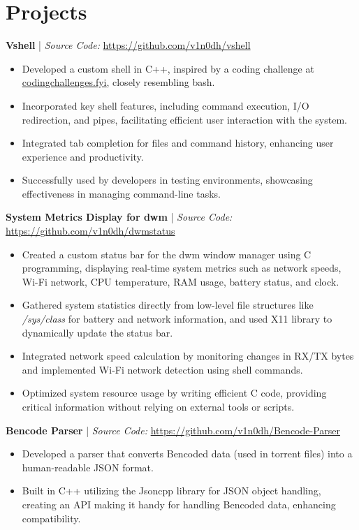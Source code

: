 \documentclass[10pt, letterpaper]{article}
\newcommand{\projsection}[2] {
	\raggedright{\normalsize\bfseries{#1}} | {\small \textit{Source Code:} \hspace{0.1em} \href{#2}{#2}}
}
\begin{document}
\section{Projects}
\projsection
{Vshell}
{https://github.com/v1n0dh/vshell}
\vspace*{-0.5em}
\begin{itemize}[leftmargin=6mm]
	\setlength\itemsep{0em}
	\item{Developed a custom shell in C++, inspired by a coding challenge at \href{https://codingchallenges.fyi/challenges/challenge-shell}{\underline {codingchallenges.fyi}}, closely resembling bash.}
	\item{Incorporated key shell features, including command execution, I/O redirection, and pipes, facilitating efficient user interaction with the system.}
	\item{Integrated tab completion for files and command history, enhancing user experience and productivity.}
	\item{Successfully used by developers in testing environments, showcasing effectiveness in managing command-line tasks.}
\end{itemize}

\projsection
{System Metrics Display for dwm}
{https://github.com/v1n0dh/dwmstatus}
\vspace*{-0.5em}
\begin{itemize}[leftmargin=6mm]
	\setlength\itemsep{0em}
	\item{Created a custom status bar for the dwm window manager using C programming, displaying real-time system metrics such as network speeds, Wi-Fi network, CPU temperature, RAM usage, battery status, and clock.}
	\item{Gathered system statistics directly from low-level file structures like \textit{/sys/class} for battery and network information, and used X11 library to dynamically update the status bar.}
	\item{Integrated network speed calculation by monitoring changes in RX/TX bytes and implemented Wi-Fi network detection using shell commands.}
	\item{Optimized system resource usage by writing efficient C code, providing critical information without relying on external tools or scripts.}
\end{itemize}

\projsection
{Bencode Parser}
{https://github.com/v1n0dh/Bencode-Parser}
\vspace*{-0.5em}
\begin{itemize}[leftmargin=6mm]
	\setlength\itemsep{0em}
	\item{Developed a parser that converts Bencoded data (used in torrent files) into a human-readable JSON format.}
	\item{Built in C++ utilizing the Jsoncpp library for JSON object handling, creating an API making it handy for handling Bencoded data, enhancing compatibility.}
\end{itemize}
\end{document}
